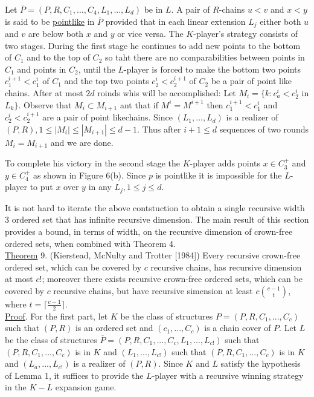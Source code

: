 \documentclass[twoside]{article}
\begin{document}
Let $\overline{P} = (P,R,C_1,...,C_4,L_1,...,L_d)$ be in $L$. A pair of $R$-chains
$u<v$ and $x<y$ is said to be \underline{pointlike} in $\overline{P}$ 
provided that in each linear extension $L_j$ either both $u$ and $v$ are below
both $x$ and $y$ or vice versa. The $K$-player's strategy consists of two 
stages. During the first stage he continues to add new points to the bottom
of $C_1$ and to the top of $C_2$ so taht there are no comparabilities between points 
in $C_1$ and points in $C_2$, until the $L$-player is forced to make the bottom
two points $c_1^{i+1} < c_1^i$ of $C_1$ and the top two points $c_2^i < c_2^{i+1}$
of $C_2$ be a pair of point like chains. After at most $2d$ roinds whis will be accomplished:
Let $M_i=\{k: c_a^i < c_2^i$ in $L_k\}$. Observe that $M_i \subset M_{i+1}$ ant that if $M^i = M^{i+1}$ then
$c^{i+1}_1 < c^i_1$ and $c_2^i < c_2^{i+1}$ are a pair of point likechains. Since $(L_1,...,L_d)$
is a realizer of $(P,R), 1 \leq |M_i| \leq |M_{i+1}| \leq d-1$. Thus after
$i+1 \leq d$ sequences of two rounds $M_i = M_{i+1}$ and we are done. 

To complete his victory in the second stage the $K$-player adds points
$x \in C_3^+$ and $y \in C_4^+$ as shown in Figure 6(b). Since $p$ is pointlike
it is impossible for the $L$-player to put $x$ over $y$ in any $L_j, 1 \leq j\leq d$.

It is not hard to iterate the above contstuction to obtain a single recursive width 3
ordered set that has infinite recursive dimension. The main result of this section provides
a bound, in terms of width, on the recursive dimension of crown-free ordered sets, when combined with Theorem 4.\\
\newline
\underline{Theorem} 9. (Kierstead, McNulty and Trotter [1984]) Every recursive crown-free
ordered set, which can be covered by $c$ recursive chains, has recursive dimension
at most $c!$; moreover there exists recursive crown-free ordered sets, which can be covered
by $c$ recursive chains, but have recursive simension at least $c {{c-1}\choose t}$, where
$t= \lceil \frac{c-1} {2} \rceil$.\\
\newline
%
%
\underline{Proof}. For the first part, let $K$ be the class of structures
$P = (P,R,C_1,...,C_c)$ such that $(P,R)$ is an ordered set and $(c_1,...,C_c)$
is a chain cover of $P$. Let $L$ be the class of structures
$\overline{P} =(P,R,C_1,...,C_c,L_1,...,L_{c!})$ such that $(P,R,C_1,...,C_c)$ is in
$K$ and $(L_1,...,L_{c!})$ such that $(P,R,C_1,...,C_c)$ is in $K$ and $(L_a,...,L_{c!})$
is a realizer of $(P,R)$. Since $K$ and $L$ satisfy the hypothesis of Lemma 1, it
suffices to provide the $L$-player with a recursive winning strategy in the $K-L$ 
expansion game.
\end{document}
